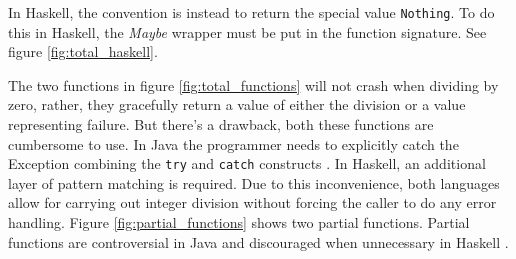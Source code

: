 \begin{figure}
\end{figure}


In Haskell, the convention is instead to return the special value
\texttt{Nothing}. To do this in Haskell, the \emph{Maybe} wrapper must be
put in the function signature. See figure \ref{fig:total_haskell}.

The two functions in figure \ref{fig:total_functions} will not crash when dividing
by zero, rather, they gracefully return a value of either the division or a
value representing failure. But there's a drawback, both these functions are
cumbersome to use. In Java the programmer needs to explicitly catch the
Exception combining the \texttt{try} and \texttt{catch} constructs
\cite{oracle_java_doc_compile_time_checking_of_exceptions, oracle_java_doc_catch}.
In Haskell, an additional layer of pattern
matching is required. Due to this inconvenience, both languages allow
for carrying out integer division without forcing the caller to do any
error handling. Figure \ref{fig:partial_functions} shows two partial
functions. Partial functions are controversial in Java
\cite{oracle_java_doc_controversy} and discouraged when unnecessary in
Haskell \cite{haskellwiki_avoiding_partial_functions}.

